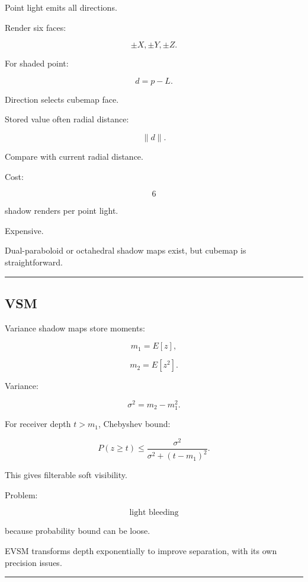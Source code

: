 \hypertarget{04-visual-computing-ii-ch040-point-light-cubemap-shadows}{}

Point light emits all directions.

Render six faces:

\[
\pm X,\pm Y,\pm Z.
\]

For shaded point:

\[
d=p-L.
\]

Direction selects cubemap face.

Stored value often radial distance:

\[
\|d\|.
\]

Compare with current radial distance.

Cost:

\[
6
\]

shadow renders per point light.

Expensive.

Dual-paraboloid or octahedral shadow maps exist, but cubemap is straightforward.

\begin{center}\rule{0.5\linewidth}{0.5pt}\end{center}

\subsection{VSM}\label{04-visual-computing-ii-ch040-vsm}

\hypertarget{04-visual-computing-ii-ch040-vsm}{}

Variance shadow maps store moments:

\[
m_1=E[z],
\]

\[
m_2=E[z^2].
\]

Variance:

\[
\sigma^2=
m_2-m_1^2.
\]

For receiver depth \(t>m_1\), Chebyshev bound:

\[
\boxed{
P(z\ge t)
\le
\frac{
\sigma^2
}{
\sigma^2+(t-m_1)^2
}.
}
\]

This gives filterable soft visibility.

Problem:

\[
\boxed{\text{light bleeding}}
\]

because probability bound can be loose.

EVSM transforms depth exponentially to improve separation, with its own precision issues.

\begin{center}\rule{0.5\linewidth}{0.5pt}\end{center}

